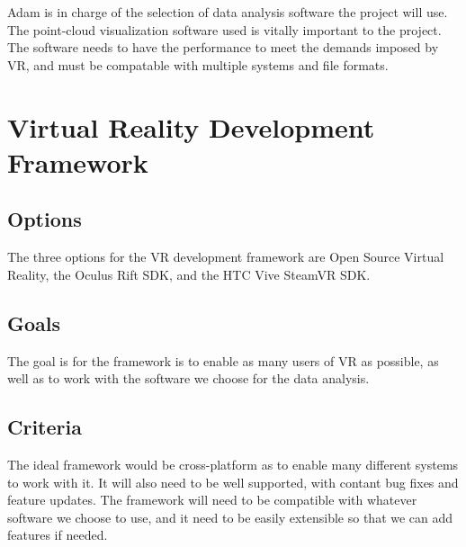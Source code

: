 \documentclass{article}
\begin{document}
Adam is in charge of the selection of data analysis software the project will use.
The point-cloud visualization software used is vitally important to the project.
The software needs to have the performance to meet the demands imposed by VR, and must be compatable with multiple systems and file formats.

\section{Virtual Reality Development Framework}

\subsection{Options}
The three options for the VR development framework are Open Source Virtual Reality, the Oculus Rift SDK,
and the HTC Vive SteamVR SDK.

\subsection{Goals}
The goal is for the framework is to enable as many users of VR as possible, as well as to work with
the software we choose for the data analysis. 

\subsection{Criteria}
The ideal framework would be cross-platform as to enable many different systems to work with it. 
It will also need to be well supported, with contant bug fixes and feature updates. The framework
will need to be compatible with whatever software we choose to use, and it need to be easily extensible
so that we can add features if needed.
\end{document}
